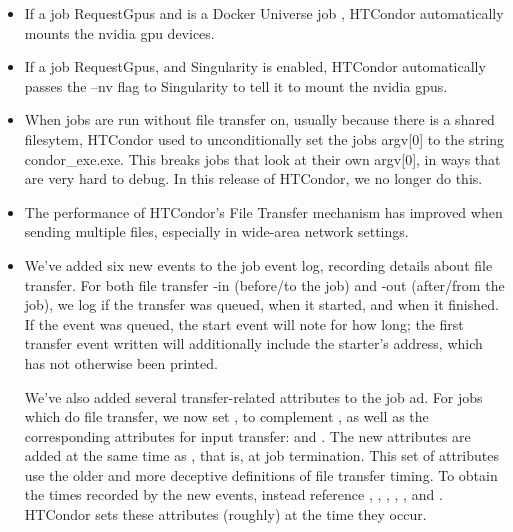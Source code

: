 \begin{itemize}

\item If a job RequestGpus and is a Docker Universe job , HTCondor
automatically mounts the nvidia gpu devices.

\item If a job RequestGpus, and Singularity is enabled, HTCondor
automatically passes the --nv flag to Singularity to tell it to mount
the nvidia gpus.

\item When jobs are run without file transfer on, usually because there is a 
shared filesytem, HTCondor used to unconditionally set the jobs argv[0]
to the string condor\_exe.exe.  This breaks jobs that look at their own
argv[0], in ways that are very hard to debug.  In this release of HTCondor, 
we no longer do this.

\item The performance of HTCondor's File Transfer mechanism has improved when
	sending multiple files, especially in wide-area network settings.

\item We've added six new events to the job event log, recording details
about file transfer.  For both file transfer -in (before/to the job) and
-out (after/from the job), we log if the transfer was queued, when it started,
and when it finished.  If the event was queued, the start event will note
for how long; the first transfer event written will additionally include
the starter's address, which has not otherwise been printed.

We've also added several transfer-related attributes to the job ad.  For jobs
which do file transfer, we now set
, to complement
, as well as the corresponding
attributes for input transfer:
 and
.  The new attributes are added at
the same time as , that is, at
job termination.  This set of attributes use the older and more deceptive
definitions of file transfer timing.  To obtain the times recorded by the
new events, instead reference ,
, ,
, , and
.  HTCondor sets these attributes (roughly) at
the time they occur.


\end{itemize}

